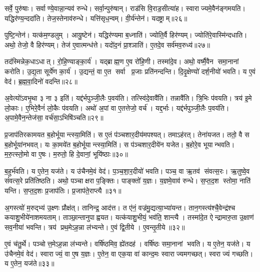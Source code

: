 सर्वे॒ पुरु॑षाः।
सर्वाण्ये॒वान्ना॒न्यव॑ रुन्धे।
सर्वा॒न्पुरु॑षान्।
राड॑सि वि॒राड॒सीत्या॑ह।
स्वाराज्यमे॒वैन॑ङ्गमयति।
यद्धिर॑ण्य॒न्ददा॑ति।
तेज॒स्तेनाव॑रुन्धे।
यत्ति॑सृध॒न्वम्।
वी॒र्य॑न्तेन॑।
यदष्ट्राम्॥२६॥

पुष्टि॒न्तेन॑।
यत्क॑म॒ण्डलुम्।
आयु॒ष्टेन॑।
यद्धिर॑ण्यमा ब॒ध्नाति॑।
ज्योति॒र्वै हिर॑ण्यम्।
ज्योति॑रे॒वास्मि॑न्दधाति।
अथो॒ तेजो॒ वै हिर॑ण्यम्।
तेज॑ ए॒वात्मन्ध॑त्ते।
यदो॑द॒नं प्रा॒श्ञाति॑।
ए॒तदे॒व सर्व॑मव॒रुध्य॑॥२७॥

तद॑स्मिन्नेक॒धाऽधात्।
रो॒हि॒ण्याङ्का॒र्य॑।
यद्ब्राह्म॒ण ए॒व रो॑हि॒णी।
तस्मा॑दे॒व।
अथो॒ वर्ष्मै॒वैन समा॒नानां करोति।
उ॒द्य॒ता सूर्ये॑ण का॒र्य॑।
उ॒द्यन्तं॒ वा ए॒त सर्वा प्र॒जाः प्रति॑नन्दन्ति।
दि॒दृ॒क्षेण्यो॑ दर्\mbox{}श॒नीयो॑ भवति।
य ए॒वं वेद॑।
ब्र॒ह्म॒वा॒दिनो॑ वदन्ति॥२८॥

अ॒वेत्यो॑ऽवभृ॒था ३ ना ३ इति॑।
यद्द॑र्भपुञ्जी॒लैः प॒वय॑ति।
तत्स्वि॑दे॒वावै॑ति।
तन्नावै॑ति।
त्रि॒भिः प॑वयति।
त्रय॑ इ॒मे लो॒काः।
ए॒भिरे॒वैनं॑ लो॒कैः प॑वयति।
अथो॑ अ॒पां वा ए॒तत्तेजो॒ वर्च॑।
यद्द॒र्भाः।
यद्द॑र्भपुञ्जी॒लैः प॒वय॑ति।
अ॒पामे॒वैन॒न्तेज॑सा॒ वर्च॑सा॒ऽभिषि॑ञ्चति॥२९॥\anuvakamend[भ॒व॒न्त्यष्ट्रा॑मव॒रुध्य॑ वदन्ति द॒र्भा यद्द॑र्भपुञ्जी॒लैः प॒वय॒त्येकं च]

प्र॒जाप॑तिरकामयत ब॒होर्भूयान्त्स्या॒मिति॑।
स ए॒तं प॑ञ्चशार॒दीय॑मपश्यत्।
तमाऽह॑रत्।
तेना॑यजत।
ततो॒ वै स ब॒होर्भूया॑नभवत्।
यः का॒मये॑त ब॒होर्भूयान्त्स्या॒मिति॑।
स प॑ञ्चशार॒दीये॑न यजेत।
ब॒होरे॒व भूयान्भवति।
म॒रु॒त्स्तो॒मो वा ए॒षः।
म॒रुतो॒ हि दे॒वानां॒ भूयि॑ष्ठाः॥३०॥

ब॒हुर्भ॑वति।
य ए॒तेन॒ यज॑ते।
य उ॑चैनमे॒वं वेद॑।
प॒ञ्च॒शा॒र॒दीयो॑ भवति।
पञ्च॒ वा ऋ॒तव॑ संवत्स॒रः।
ऋ॒तुष्वे॒व सं॑वत्स॒रे प्रति॑तिष्ठति।
अथो॒ पञ्चाक्षरा प॒ङ्क्तिः।
पाङ्क्तो॑ य॒ज्ञः।
य॒ज्ञमे॒वाव॑ रुन्धे।
स॒प्त॒द॒श स्तोमा॒ नाति॑ यन्ति।
स॒प्त॒द॒शः प्र॒जाप॑तिः।
प्र॒जाप॑ते॒राप्त्यै॥३१॥\anuvakamend[भूयि॑ष्ठा यन्ति॒ द्वे च॑]

अ॒गस्त्यो॑ म॒रुद्भ्य॑ उ॒क्ष्णः प्रौक्ष॑त्।
तानिन्द्र॒ आद॑त्त।
त ए॑नं॒ वज्र॑मु॒द्यत्या॒भ्या॑यन्त।
तान॒गस्त्य॑श्चै॒वेन्द्र॑श्च कयाशु॒भीये॑नाशमयताम्।
ताञ्छा॒न्तानुपाह्वयत।
यत्क॑याशु॒भीयं॒ भव॑ति॒ शान्त्यै।
तस्मा॑दे॒त ऐन्द्रामारु॒ता उ॒क्षाण॑ सव॒नीया॑ भवन्ति।
त्रय॑ प्रथ॒मेऽह॒न्ना ल॑भ्यन्ते।
ए॒वं द्वि॒तीये।
ए॒वन्तृ॒तीये॥३२॥

ए॒वं च॑तु॒र्थे।
पञ्चोत्त॒मेऽह॒न्ना ल॑भ्यन्ते।
वर्\mbox{}षि॑ष्ठमिव॒ ह्ये॑तदह॑।
वर्\mbox{}षि॑ष्ठः समा॒नानां भवति।
य ए॒तेन॒ यज॑ते।
य उ॑चैनमे॒वं वेद॑।
स्वाराज्यं॒ वा ए॒ष य॒ज्ञः।
ए॒तेन॒ वा एक॒या वा॑ कान्द॒मः स्वाराज्यमगच्छत्।
स्वराज्यं गच्छति।
य ए॒तेन॒ यज॑ते॥३३॥

